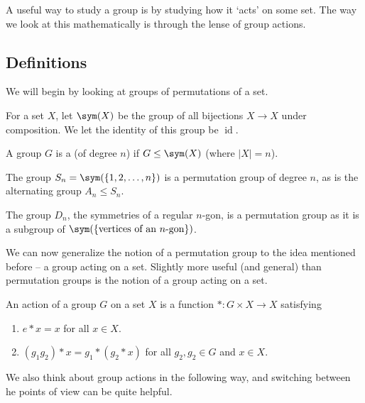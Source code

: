 \documentclass[a4paper]{scrartcl}
\begin{document}
A useful way to study a group is by studying how it `acts' on some set.
The way we look at this mathematically is through the lense of group actions.

\subsection{Definitions}

We will begin by looking at groups of permutations of a set.

\begin{definition}[$\sym(X)$]
	For a set $X$, let $\sym(X)$ be the group of all bijections $X \rightarrow X$ under composition. We let the identity of this group be $\operatorname{id}$.
\end{definition}

\begin{definition}
	A group $G$ is a  (of degree $n$) if $G \leq \sym(X)$ (where $|X| = n$).
\end{definition}

\begin{example}
	The group $S_n = \sym(\{1, 2, \dots, n\})$ is a permutation group of degree $n$, as is the alternating group $A_n \leq S_n$.

	The group $D_n$, the symmetries of a regular $n$-gon, is a permutation group as it is a subgroup of $\sym(\{\text{vertices of an $n$-gon}\})$.
\end{example}

We can now generalize the notion of a permutation group to the idea mentioned before -- a group acting on a set.
Slightly more useful (and general) than permutation groups is the notion of a group acting on a set.

\begin{definition}
	An action of a group $G$ on a set $X$ is a function $*: G \times X \rightarrow X$ satisfying
	\begin{enumerate}[label=(\roman*)]
		\item $e * x = x$ for all $x \in X$.
		\item $(g_1 g_2) * x = g_1 * (g_2 * x)$ for all $g_2, g_2 \in G$ and $x \in X$.
	\end{enumerate}
\end{definition}

We also think about group actions in the following way, and switching between he points of view can be quite helpful.
\end{document}
